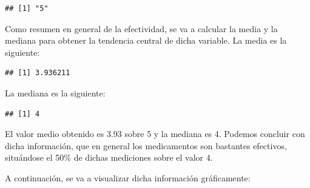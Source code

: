 \documentclass[spanish,]{article}
\newenvironment{Shaded}{\begin{snugshade}}{\end{snugshade}}
\newcommand{\KeywordTok}[1]{\textcolor[rgb]{0.13,0.29,0.53}{\textbf{#1}}}
\newcommand{\CommentTok}[1]{\textcolor[rgb]{0.56,0.35,0.01}{\textit{#1}}}
\newcommand{\OperatorTok}[1]{\textcolor[rgb]{0.81,0.36,0.00}{\textbf{#1}}}
\newcommand{\NormalTok}[1]{#1}
\begin{document}
\begin{Shaded}
\end{Shaded}

\begin{verbatim}
## [1] "5"
\end{verbatim}

Como resumen en general de la efectividad, se va a calcular la media y
la mediana para obtener la tendencia central de dicha variable. La media
es la siguiente:

\begin{Shaded}
\end{Shaded}

\begin{verbatim}
## [1] 3.936211
\end{verbatim}

La mediana es la siguiente:

\begin{Shaded}
\end{Shaded}

\begin{verbatim}
## [1] 4
\end{verbatim}

El valor medio obtenido es 3.93 sobre 5 y la mediana es 4. Podemos
concluir con dicha información, que en general los medicamentos son
bastantes efectivos, situándose el 50\% de dichas mediciones sobre el
valor 4.

A continuación, se va a visualizar dicha información gráficamente:
\end{document}
